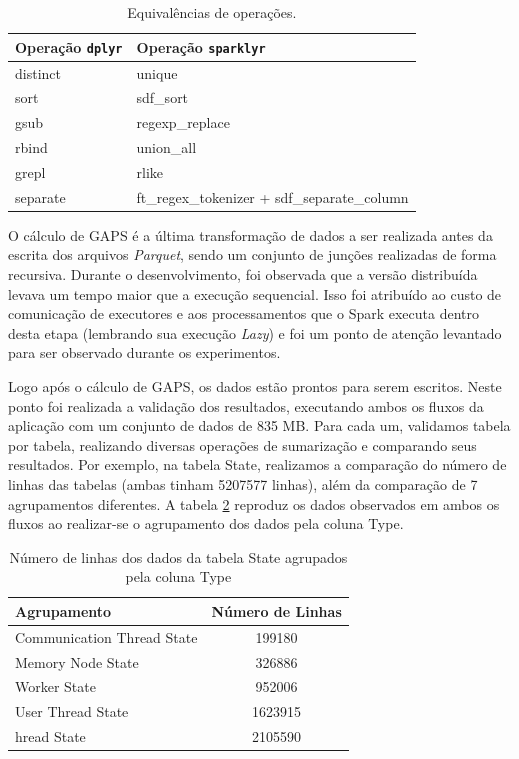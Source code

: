 \begin{table}[H]
\centering
\small
\begin{tabular}{l l} \toprule
\textbf{Operação \texttt{dplyr}}  &  \textbf{Operação \texttt{sparklyr}}\\ 
\midrule
distinct	& unique  \\
sort		& sdf\_sort \\
gsub		& regexp\_replace\\
rbind		& union\_all\\
grepl		& rlike\\
separate	& ft\_regex\_tokenizer + sdf\_separate\_column       \\
\end{tabular}
\caption{Equivalências de operações.}
\label{tab:equivalence}
\end{table}

O cálculo de GAPS é a última transformação de dados a ser realizada antes da 
escrita dos arquivos \textit{Parquet}, sendo um conjunto de junções realizadas 
de forma recursiva. Durante o desenvolvimento, foi observada que a versão 
distribuída levava um tempo maior que a execução sequencial. Isso foi atribuído 
ao custo de comunicação de executores e aos processamentos que o Spark 
executa dentro desta etapa (lembrando sua execução \emph{Lazy}) e foi um ponto 
de atenção levantado para ser observado durante os experimentos.

Logo após o cálculo de GAPS, os dados estão prontos para serem escritos. Neste 
ponto foi realizada a validação dos resultados, executando ambos os 
fluxos da aplicação com um conjunto de dados de 835 MB. Para cada um, validamos 
tabela por tabela, realizando diversas operações de sumarização e comparando 
seus resultados. Por exemplo, na tabela State, realizamos a comparação do 
número de linhas das tabelas (ambas tinham 5207577 linhas), além da comparação 
de 7 agrupamentos diferentes. A tabela \ref{tab:validation} reproduz os dados 
observados em ambos os fluxos ao realizar-se o agrupamento dos dados pela coluna 
Type.

\begin{table}[H]
\centering
\small
\begin{tabular}{l c} \toprule
\textbf{Agrupamento}  &  \textbf{Número de Linhas} \\ 
\midrule
Communication Thread State	& 199180 \\
Memory Node State		& 326886 \\
Worker State			& 952006 \\
User Thread State		& 1623915 \\
hread State			& 2105590 \\
\end{tabular}
\caption{Número de linhas dos dados da tabela State agrupados pela coluna Type}
\label{tab:validation}
\end{table}

